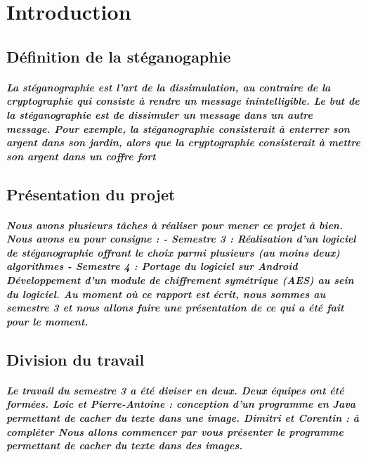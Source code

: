 \documentclass[a4paper, titlepage]{report}
\begin{document}
\chapter*{Introduction}

  \section*{Définition de la stéganogaphie}

    \paragraph{La stéganographie est l'art de la dissimulation, au contraire de la cryptographie qui consiste à rendre un message inintelligible. Le but de la stéganographie est de dissimuler un message dans un autre message. Pour exemple, la stéganographie consisterait à enterrer son argent dans son jardin, alors que la cryptographie consisterait à mettre son argent dans un coffre fort}

  \section{Présentation du projet}

    \paragraph{Nous avons plusieurs tâches à réaliser pour mener ce projet à bien. Nous avons eu pour consigne : \newline - Semestre 3 : Réalisation d'un logiciel de stéganographie offrant le choix parmi plusieurs (au moins deux) algorithmes \newline - Semestre 4 : Portage du logiciel sur Android  Développement d'un module de chiffrement symétrique (AES) au sein du logiciel. \newline Au moment où ce rapport est écrit, nous sommes au semestre 3 et nous allons faire une présentation de ce qui a été fait pour le moment.}

  \section{Division du travail}

    \paragraph{Le travail du semestre 3 a été diviser en deux. Deux équipes ont été formées. \newline Loic et Pierre-Antoine : conception d'un programme en Java permettant de cacher du texte dans une image. \newline Dimitri et Corentin : à compléter \newline \newline Nous allons commencer par vous présenter le programme permettant de cacher du texte dans des images.}


\chapter{}
\end{document}
